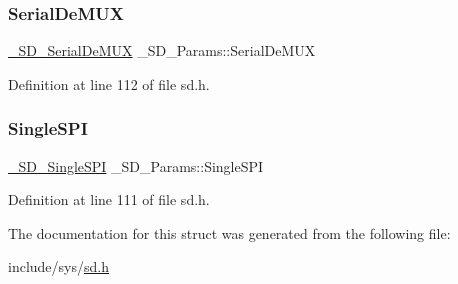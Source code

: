 \mbox{\label{struct__SD__Params_aaed065c1970e2b13c97f02c6948f7e16}} 
\subsubsection{\texorpdfstring{SerialDeMUX}{SerialDeMUX}}
{\footnotesize\ttfamily \mbox{\hyperlink{struct__SD__SerialDeMUX}{\+\_\+\+S\+D\+\_\+\+Serial\+De\+M\+UX}} \+\_\+\+S\+D\+\_\+\+Params\+::\+Serial\+De\+M\+UX}



Definition at line 112 of file sd.\+h.

\mbox{\label{struct__SD__Params_ae880e39a0b7f582e73d56e9cece8968f}} 
\subsubsection{\texorpdfstring{SingleSPI}{SingleSPI}}
{\footnotesize\ttfamily \mbox{\hyperlink{struct__SD__SingleSPI}{\+\_\+\+S\+D\+\_\+\+Single\+S\+PI}} \+\_\+\+S\+D\+\_\+\+Params\+::\+Single\+S\+PI}



Definition at line 111 of file sd.\+h.



The documentation for this struct was generated from the following file\+:\begin{DoxyCompactItemize}
\item 
include/sys/\mbox{\hyperlink{sd_8h}{sd.\+h}}\end{DoxyCompactItemize}
